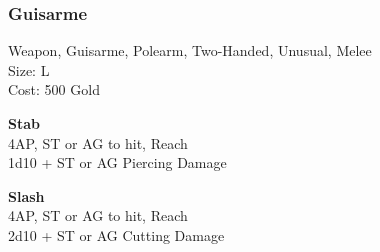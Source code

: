 \subsubsection{Guisarme}\label{weapon:guisarme}
Weapon, Guisarme, Polearm, Two-Handed, Unusual, Melee\\
Size: L\\
Cost: 500 Gold

\textbf{Stab}\\
4AP, ST or AG to hit,  Reach\\
1d10 + \texttimes ST or AG Piercing Damage

\textbf{Slash}\\
4AP, ST or AG to hit,  Reach\\
2d10 + \texttimes ST or AG Cutting Damage
